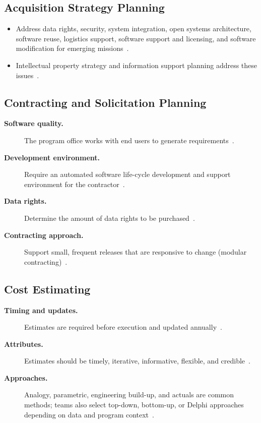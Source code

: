 \documentclass[../main.tex]{subfiles}
\begin{document}
\subsection{Acquisition Strategy Planning}
\begin{itemize}
  \item Address data rights, security, system integration, open systems architecture, software reuse, logistics support, software support and licensing, and software modification for emerging missions~\autocite{edo-3-4-2-software-acquisition-management-2025}.
  \item Intellectual property strategy and information support planning address these issues~\autocite{edo-3-4-2-software-acquisition-management-2025}.
\end{itemize}

\subsection{Contracting and Solicitation Planning}
\begin{description}
  \item[\textbf{Software quality.}] The program office works with end users to generate requirements~\autocite{edo-3-4-2-software-acquisition-management-2025}.
  \item[\textbf{Development environment.}] Require an automated software life-cycle development and support environment for the contractor~\autocite{edo-3-4-2-software-acquisition-management-2025}.
  \item[\textbf{Data rights.}] Determine the amount of data rights to be purchased~\autocite{edo-3-4-2-software-acquisition-management-2025}.
  \item[\textbf{Contracting approach.}] Support small, frequent releases that are responsive to change (modular contracting)~\autocite{edo-3-4-2-software-acquisition-management-2025}.
\end{description}

\subsection{Cost Estimating}
\begin{description}
  \item[\textbf{Timing and updates.}] Estimates are required before execution and updated annually~\autocite{edo-3-4-2-software-acquisition-management-2025,DoDI5000-87}.
  \item[\textbf{Attributes.}] Estimates should be timely, iterative, informative, flexible, and credible~\autocite{edo-3-4-2-software-acquisition-management-2025}.
  \item[\textbf{Approaches.}] Analogy, parametric, engineering build-up, and actuals are common methods; teams also select top-down, bottom-up, or Delphi approaches depending on data and program context~\autocite{edo-3-4-2-software-acquisition-management-2025}.
\end{description}
\end{document}
